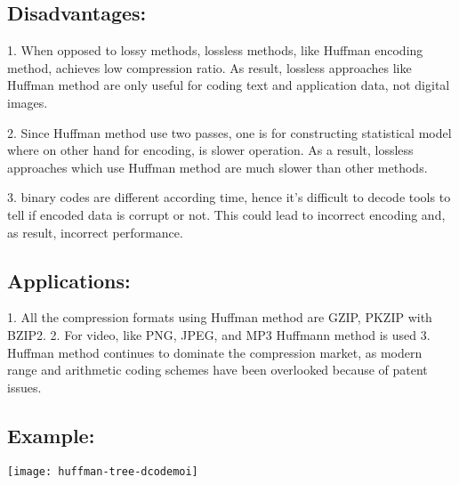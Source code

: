 \documentclass[a4paper, 12pt]{article}
\begin{document}
\subsection{Disadvantages:}
\par 1. When opposed to lossy methods, lossless methods, like Huffman encoding
method, achieves low compression ratio. As result, lossless approaches like Huffman method are only useful for coding text and application data, not 
digital images.
\par 2. Since Huffman method use two passes, one is for constructing statistical 
model where on other hand for encoding, is slower operation. As a result, 
lossless approaches which use Huffman method are much slower than other 
methods.\\
\par 3. binary codes are different according time, hence it's difficult to decode
tools to tell if encoded data is corrupt or not. This could lead to incorrect 
encoding and, as result, incorrect performance.\\

\subsection{Applications:}
\par 1. All the compression formats using Huffman method are GZIP, PKZIP with
BZIP2.
2. For video, like PNG, JPEG, and MP3 Huffmann method is used 
3. Huffman method continues to dominate the compression market, as modern 
range and arithmetic coding schemes have been overlooked because of patent 
issues.
\\

\subsection{Example:}
\texttt{[image: huffman-tree-dcodemoi]}

\vspace{5mm}


\newpage
\end{document}
